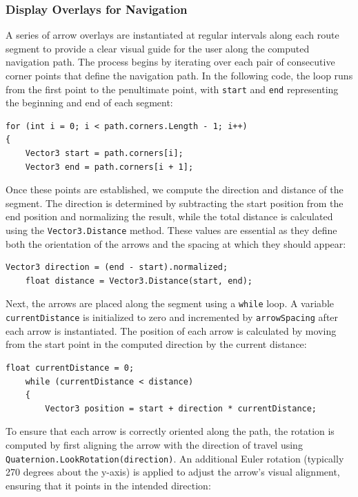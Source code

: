 \subsubsection{Display Overlays for Navigation}
A series of arrow overlays are instantiated at regular intervals along each route segment to provide a clear visual guide for the user along the computed navigation path. The process begins by iterating over each pair of consecutive corner points that define the navigation path. In the following code, the loop runs from the first point to the penultimate point, with \texttt{start} and \texttt{end} representing the beginning and end of each segment:

\begin{lstlisting}[style=cSharp]
for (int i = 0; i < path.corners.Length - 1; i++)
{
    Vector3 start = path.corners[i];
    Vector3 end = path.corners[i + 1];
\end{lstlisting}

Once these points are established, we compute the direction and distance of the segment. The direction is determined by subtracting the start position from the end position and normalizing the result, while the total distance is calculated using the \texttt{Vector3.Distance} method. These values are essential as they define both the orientation of the arrows and the spacing at which they should appear:

\begin{lstlisting}[style=cSharp]
    Vector3 direction = (end - start).normalized;
    float distance = Vector3.Distance(start, end);
\end{lstlisting}

Next, the arrows are placed along the segment using a \texttt{while} loop. A variable \texttt{currentDistance} is initialized to zero and incremented by \texttt{arrowSpacing} after each arrow is instantiated. The position of each arrow is calculated by moving from the start point in the computed direction by the current distance:

\begin{lstlisting}[style=cSharp]
    float currentDistance = 0;
    while (currentDistance < distance)
    {
        Vector3 position = start + direction * currentDistance;
\end{lstlisting}

To ensure that each arrow is correctly oriented along the path, the rotation is computed by first aligning the arrow with the direction of travel using \texttt{Quaternion.LookRotation(direction)}. An additional Euler rotation (typically 270 degrees about the y-axis) is applied to adjust the arrow's visual alignment, ensuring that it points in the intended direction:

